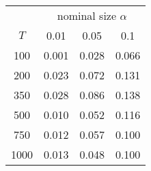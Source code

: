 % 
\begin{tabular}{cccc}
  \hline
  & \multicolumn{3}{c}{nominal size $\alpha$} \\
 $T$ & 0.01 & 0.05 & 0.1 \\
 \hline
100 & 0.001 & 0.028 & 0.066 \\ 
  200 & 0.023 & 0.072 & 0.131 \\ 
  350 & 0.028 & 0.086 & 0.138 \\ 
  500 & 0.010 & 0.052 & 0.116 \\ 
  750 & 0.012 & 0.057 & 0.100 \\ 
  1000 & 0.013 & 0.048 & 0.100 \\ 
   \hline
\end{tabular}
